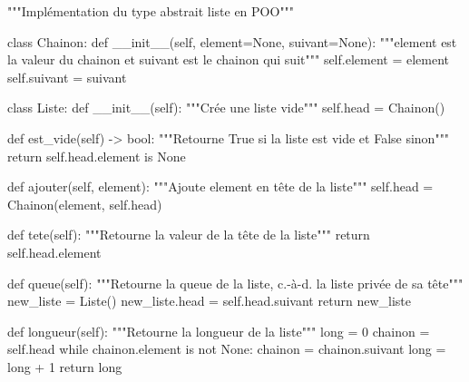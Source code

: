 \documentclass[
  letterpaper,
  DIV=11,
  numbers=noendperiod]{scrartcl}
\newenvironment{Shaded}{\begin{snugshade}}{\end{snugshade}}
\newcommand{\BuiltInTok}[1]{\textcolor[rgb]{0.00,0.23,0.31}{#1}}
\newcommand{\CommentTok}[1]{\textcolor[rgb]{0.37,0.37,0.37}{#1}}
\newcommand{\ControlFlowTok}[1]{\textcolor[rgb]{0.00,0.23,0.31}{#1}}
\newcommand{\DecValTok}[1]{\textcolor[rgb]{0.68,0.00,0.00}{#1}}
\newcommand{\FunctionTok}[1]{\textcolor[rgb]{0.28,0.35,0.67}{#1}}
\newcommand{\KeywordTok}[1]{\textcolor[rgb]{0.00,0.23,0.31}{#1}}
\newcommand{\NormalTok}[1]{\textcolor[rgb]{0.00,0.23,0.31}{#1}}
\newcommand{\OperatorTok}[1]{\textcolor[rgb]{0.37,0.37,0.37}{#1}}
\newcommand{\VariableTok}[1]{\textcolor[rgb]{0.07,0.07,0.07}{#1}}
\begin{document}
\begin{Shaded}
\begin{Highlighting}[]
\CommentTok{"""Implémentation du type abstrait liste en POO"""}


\KeywordTok{class}\NormalTok{ Chainon:}
    \KeywordTok{def} \FunctionTok{\_\_init\_\_}\NormalTok{(}\VariableTok{self}\NormalTok{, element}\OperatorTok{=}\VariableTok{None}\NormalTok{, suivant}\OperatorTok{=}\VariableTok{None}\NormalTok{):}
        \CommentTok{"""element est la valeur du chainon et suivant est le chainon qui suit"""}
        \VariableTok{self}\NormalTok{.element }\OperatorTok{=}\NormalTok{ element}
        \VariableTok{self}\NormalTok{.suivant }\OperatorTok{=}\NormalTok{ suivant}


\KeywordTok{class}\NormalTok{ Liste:}
    \KeywordTok{def} \FunctionTok{\_\_init\_\_}\NormalTok{(}\VariableTok{self}\NormalTok{):}
        \CommentTok{"""Crée une liste vide"""}
        \VariableTok{self}\NormalTok{.head }\OperatorTok{=}\NormalTok{ Chainon()}

    \KeywordTok{def}\NormalTok{ est\_vide(}\VariableTok{self}\NormalTok{) }\OperatorTok{{-}\textgreater{}} \BuiltInTok{bool}\NormalTok{:}
        \CommentTok{"""Retourne True si la liste est vide et False sinon"""}
        \ControlFlowTok{return} \VariableTok{self}\NormalTok{.head.element }\KeywordTok{is} \VariableTok{None}

    \KeywordTok{def}\NormalTok{ ajouter(}\VariableTok{self}\NormalTok{, element):}
        \CommentTok{"""Ajoute element en tête de la liste"""}
        \VariableTok{self}\NormalTok{.head }\OperatorTok{=}\NormalTok{ Chainon(element, }\VariableTok{self}\NormalTok{.head)}

    \KeywordTok{def}\NormalTok{ tete(}\VariableTok{self}\NormalTok{):}
        \CommentTok{"""Retourne la valeur de la tête de la liste"""}
        \ControlFlowTok{return} \VariableTok{self}\NormalTok{.head.element}

    \KeywordTok{def}\NormalTok{ queue(}\VariableTok{self}\NormalTok{):}
        \CommentTok{"""Retourne la queue de la liste, c.{-}à{-}d. la liste privée de sa tête"""}
\NormalTok{        new\_liste }\OperatorTok{=}\NormalTok{ Liste()}
\NormalTok{        new\_liste.head }\OperatorTok{=} \VariableTok{self}\NormalTok{.head.suivant}
        \ControlFlowTok{return}\NormalTok{ new\_liste}

    \KeywordTok{def}\NormalTok{ longueur(}\VariableTok{self}\NormalTok{):}
        \CommentTok{"""Retourne la longueur de la liste"""}
        \BuiltInTok{long} \OperatorTok{=} \DecValTok{0}
\NormalTok{        chainon }\OperatorTok{=} \VariableTok{self}\NormalTok{.head}
        \ControlFlowTok{while}\NormalTok{ chainon.element }\KeywordTok{is} \KeywordTok{not} \VariableTok{None}\NormalTok{:}
\NormalTok{            chainon }\OperatorTok{=}\NormalTok{ chainon.suivant}
            \BuiltInTok{long} \OperatorTok{=} \BuiltInTok{long} \OperatorTok{+} \DecValTok{1}
        \ControlFlowTok{return} \BuiltInTok{long}
\end{Highlighting}
\end{Shaded}
\end{document}

